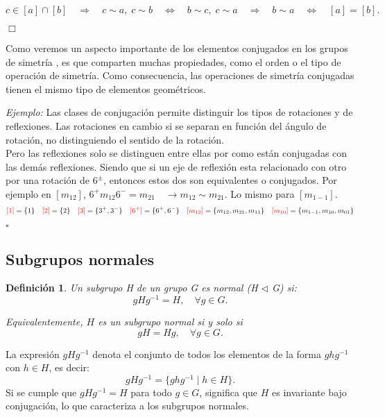\documentclass{report}
\newtheorem{definition}{Definición}
\begin{document}
\[
c \in [a] \cap [b] \quad \Longrightarrow \quad c \sim a, \; c \sim b \quad \Longleftrightarrow \quad b \sim c, \; c \sim a \quad \Longrightarrow \quad b \sim a \quad \Longleftrightarrow \quad [a] = [b].
\]

\hfill \(\Box\)


Como veremos un aspecto importante de los elementos conjugados en los grupos de simetría , es que comparten muchas propiedades, como el orden o el tipo de operación de simetría. Como consecuencia, las operaciones de simetría conjugadas tienen el mismo tipo de elementos geométricos.\\
\vspace{.5cm}


\textit{Ejemplo:}
Las clases de conjugación permite distinguir los tipos de rotaciones y de reflexiones. Las rotaciones en cambio si se separan en función del ángulo de rotación, no distinguiendo el sentido de la rotación.\\
\vspace{.2cm} 
 Pero las reflexiones solo se distinguen entre ellas por como están conjugadas con las demás reflexiones. Siendo que si un eje de reflexión esta relacionado con otro por una rotación de $6^\pm$, entonces estos dos son equivalentes o conjugados.
 Por ejemplo en $[m_{12}]$,  $ 6^+ m_{12}6^-=m_{21}\quad \rightarrow m_{12}\sim m_{21}$. Lo mismo para $[m_{1-1}]$. 
\[
 \textcolor{red}{[1]} = \{1\}
\quad
 \textcolor{red}{ [2]} = \{2\}
\quad
 \textcolor{red}{[3]} = \{3^+, 3^-\}
\quad
  \textcolor{red}{[6^+]} = \{6^+, 6^-\}
\quad
  \textcolor{red}{[m_{12}]} = \{m_{12}, m_{21}, m_{11} \}
\quad
  \textcolor{red}{[m_{10}]} = \{m_{1-1}, m_{10}, m_{01} \}
\]


\hfill $\square$\\


\subsection{Subgrupos normales}
\begin{definition}
 Un subgrupo H de un grupo G es normal (H $\triangleleft$ G) si:
\[
g H g^{-1} = H , \quad \forall g \in G.
\]

Equivalentemente, \( H \) es un subgrupo normal si y solo si
\[
gH = Hg , \quad \forall g \in G.
\]
\end{definition}


La expresión \( g H g^{-1} \) denota el conjunto de todos los elementos de la forma \( ghg^{-1} \) con \( h \in H \), es decir:
\[
g H g^{-1} = \{ ghg^{-1} \mid h \in H \}.
\]
Si se cumple que \( g H g^{-1} = H \) para todo \( g \in G \), significa que \( H \) es invariante bajo conjugación, lo que caracteriza a los subgrupos normales.\\
\end{document}
